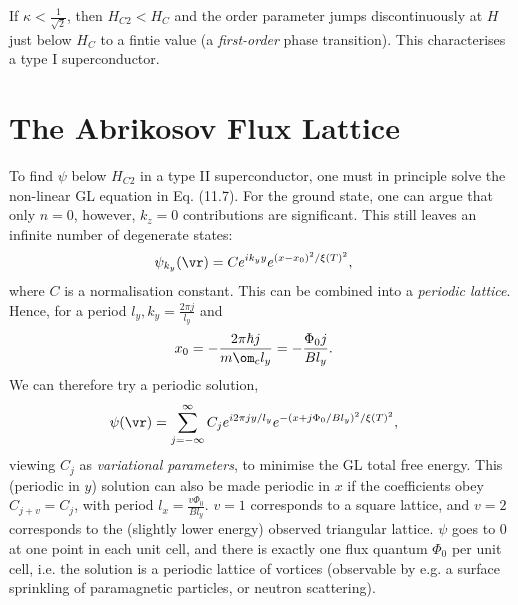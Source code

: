 \documentclass[qo.tex]{subfiles}
\begin{document}
If $\kappa<\frac{1}{\sqrt{2}}$, then $H_{C2}<H_C$ and the order parameter jumps discontinuously at $H$ just below $H_C$ to a fintie value (a \emph{first-order} phase transition).
This characterises a type I superconductor.

\section{The Abrikosov Flux Lattice}
To find $\psi$ below $H_{C2}$ in a type II superconductor, one must in principle solve the non-linear GL equation in Eq. (11.7).
For the ground state, one can argue that only $n=0$, however, $k_z=0$ contributions are significant.
This still leaves an infinite number of degenerate states:
\begin{align}
    \psi_{k_y}(\vr) &= Ce^{ik_yy}e^{(x-x_0)^2/\xi(T)^2},
\end{align}
where $C$ is a normalisation constant.
This can be combined into a \emph{periodic lattice}.
Hence, for a period $l_y,k_y=\frac{2\pi j}{l_y}$ and
\begin{align}
    x_0 &= -\frac{2\pi\hbar j}{m\om_c l_y} = -\frac{\Phi_0j}{Bl_y}.
\end{align}
We can therefore try a periodic solution,
\begin{align}
    \psi(\vr) &= \sum_{j=-\infty}^{\infty} C_je^{i2\pi jy/l_y}e^{-(x+j\Phi_0/Bl_y)^2/\xi(T)^2},
\end{align}
viewing $C_j$ as \emph{variational parameters}, to minimise the GL total free energy.
This (periodic in $y$) solution can also be made periodic in $x$ if the coefficients obey $C_{j+v}=C_j$, with period $l_x=\frac{v\Phi_0}{Bl_y}$.
$v=1$ corresponds to a square lattice, and $v=2$ corresponds to the (slightly lower energy) observed triangular lattice.
$\psi$ goes to 0 at one point in each unit cell, and there is exactly one flux quantum $\Phi_0$ per unit cell, i.e. the solution is a periodic lattice of vortices (observable by e.g. a surface sprinkling of paramagnetic particles, or neutron scattering).
\end{document}
